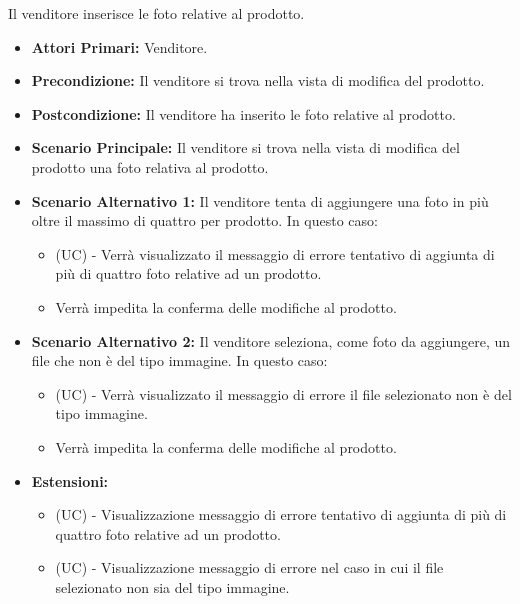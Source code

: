 Il venditore inserisce le foto relative al prodotto.
\begin{itemize}
    \item \textbf{Attori Primari:} Venditore.
    \item \textbf{Precondizione:} Il venditore si trova nella vista di modifica del prodotto.
    \item \textbf{Postcondizione:} Il venditore ha inserito le foto relative al prodotto.
    \item \textbf{Scenario Principale:} Il venditore si trova nella vista di modifica del prodotto una foto relativa al prodotto.
    \item \textbf{Scenario Alternativo 1:} Il venditore tenta di aggiungere una foto in più oltre il massimo di quattro per prodotto. In questo caso:
    \begin{itemize}
        \item (UC) - Verrà visualizzato il messaggio di errore tentativo di aggiunta di più di quattro foto relative ad un prodotto.
        \item Verrà impedita la conferma delle modifiche al prodotto.
    \end{itemize}
    \item \textbf{Scenario Alternativo 2:} Il venditore seleziona, come foto da aggiungere, un file che non è del tipo immagine. In questo caso:
    \begin{itemize}
        \item (UC) - Verrà visualizzato il messaggio di errore il file selezionato non è del tipo immagine.
        \item Verrà impedita la conferma delle modifiche al prodotto.
    \end{itemize}
    \item \textbf{Estensioni:}
    \begin{itemize}
        \item (UC) - Visualizzazione messaggio di errore tentativo di aggiunta di più di quattro foto relative ad un prodotto.
        \item (UC) - Visualizzazione messaggio di errore nel caso in cui il file selezionato non sia del tipo immagine.
    \end{itemize}
\end{itemize}

